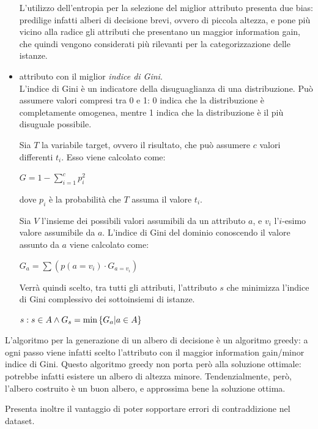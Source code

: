 \begin{itemize}
    L'utilizzo dell'entropia per la selezione del miglior attributo presenta due
    bias: predilige infatti alberi di decisione brevi, ovvero di piccola
    altezza, e pone più vicino alla radice gli attributi che presentano un
    maggior information gain, che quindi vengono considerati più rilevanti per
    la categorizzazione delle istanze.
    
    \item attributo con il miglior \textit{indice di Gini}.\\
    L'indice di Gini è un indicatore della disuguaglianza di una distribuzione.
    Può assumere valori compresi tra 0 e 1: 0 indica che la distribuzione è
    completamente omogenea, mentre 1 indica che la distribuzione è il più
    disuguale possibile.
    
    Sia $T$ la variabile target, ovvero il risultato, che può assumere $c$
    valori differenti $t_i$. Esso viene calcolato come:
    \begin{center}
        $G = 1 - \sum\limits_{i=1}^{c} p_i^2$
    \end{center}
    dove $p_i$ è la probabilità che $T$ assuma il valore $t_i$.
    
    Sia $V$ l'insieme dei possibili valori assumibili da un attributo $a$, e
    $v_i$ l'$i$-esimo valore assumibile da $a$. L'indice di Gini del dominio
    conoscendo il valore assunto da $a$ viene calcolato come:
    \begin{center}
        $G_a = \sum\limits \left( p(a = v_i) \cdot G_{a = v_i} \right) $
    \end{center}
    Verrà quindi scelto, tra tutti gli attributi, l'attributo $s$ che minimizza
    l'indice di Gini complessivo dei sottoinsiemi di istanze.
    \begin{center}
        $s : s \in A \land G_s = \textnormal{min}\left\{ G_a | a \in A \right\}$
    \end{center}
\end{itemize}
L'algoritmo per la generazione di un albero di decisione è un algoritmo greedy:
a ogni passo viene infatti scelto l'attributo con il maggior information
gain/minor indice di Gini. Questo algoritmo greedy non porta però alla soluzione
ottimale: potrebbe infatti esistere un albero di altezza minore.
Tendenzialmente, però, l'albero costruito è un buon albero, e approssima bene
la soluzione ottima.

Presenta inoltre il vantaggio di poter sopportare errori di contraddizione nel
dataset.

